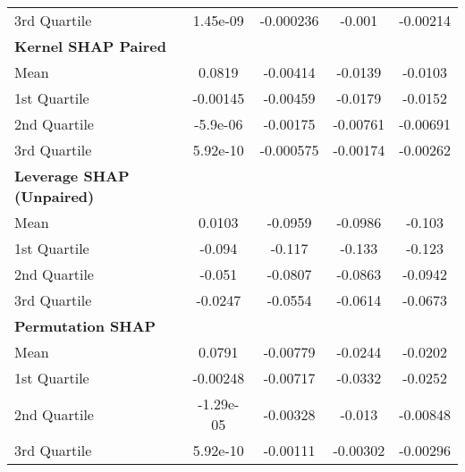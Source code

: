 {\begin{tabular} {lcccc}
\hspace{7pt}3rd Quartile & 1.45e-09 & -0.000236 & -0.001 & -0.00214 \\ 
\addlinespace[1ex] 
\textbf{Kernel SHAP Paired} &  &  &  &  \\ 
\hspace{7pt}Mean & 0.0819 & -0.00414 & -0.0139 & -0.0103 \\ 
\hspace{7pt}1st Quartile & -0.00145 & -0.00459 & -0.0179 & -0.0152 \\ 
\hspace{7pt}2nd Quartile & -5.9e-06 & -0.00175 & -0.00761 & -0.00691 \\ 
\hspace{7pt}3rd Quartile & \cellcolor{bronze!60}5.92e-10 & -0.000575 & -0.00174 & -0.00262 \\ 
\addlinespace[1ex] 
\textbf{Leverage SHAP (Unpaired)} &  &  &  &  \\ 
\hspace{7pt}Mean & \cellcolor{silver!60}0.0103 & \cellcolor{silver!60}-0.0959 & \cellcolor{silver!60}-0.0986 & \cellcolor{silver!60}-0.103 \\ 
\hspace{7pt}1st Quartile & \cellcolor{silver!60}-0.094 & \cellcolor{silver!60}-0.117 & \cellcolor{silver!60}-0.133 & \cellcolor{silver!60}-0.123 \\ 
\hspace{7pt}2nd Quartile & \cellcolor{silver!60}-0.051 & \cellcolor{silver!60}-0.0807 & \cellcolor{silver!60}-0.0863 & \cellcolor{silver!60}-0.0942 \\ 
\hspace{7pt}3rd Quartile & \cellcolor{gold!60}-0.0247 & \cellcolor{silver!60}-0.0554 & \cellcolor{silver!60}-0.0614 & \cellcolor{silver!60}-0.0673 \\ 
\addlinespace[1ex] 
\textbf{Permutation SHAP} &  &  &  &  \\ 
\hspace{7pt}Mean & \cellcolor{bronze!60}0.0791 & -0.00779 & \cellcolor{bronze!60}-0.0244 & \cellcolor{bronze!60}-0.0202 \\ 
\hspace{7pt}1st Quartile & \cellcolor{bronze!60}-0.00248 & -0.00717 & \cellcolor{bronze!60}-0.0332 & \cellcolor{bronze!60}-0.0252 \\ 
\hspace{7pt}2nd Quartile & \cellcolor{bronze!60}-1.29e-05 & -0.00328 & -0.013 & -0.00848 \\ 
\hspace{7pt}3rd Quartile & \cellcolor{bronze!60}5.92e-10 & -0.00111 & -0.00302 & -0.00296 \\ 
\bottomrule
\end{tabular}}